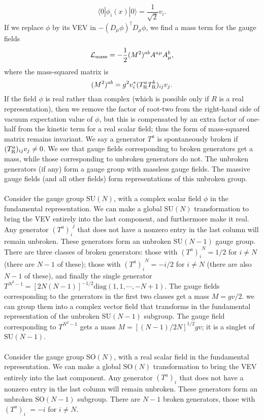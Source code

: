 \[\langle 0 | \phi_i(x) | 0 \rangle = \frac{1}{\sqrt{2}}v_i.\]
If we replace $\phi$ by its VEV in $-(D_{\mu}\phi)^{\dagger}D_{\mu}\phi$, we find a mass term for the gauge fields
\[\mathcal{L}_{\rm mass} = - \frac{1}{2}(M^2)^{ab}A^{a\mu}A^b_{\mu},\]
where the mass-squared matrix is
\[(M^2)^{ab} = g^2 v_i^* (T^a_{\rm R} T^b_{\rm R})_{ij}v_j .\]
If the field $\phi$ is real rather than complex (which is possible only if $R$ is a real representation), then we remove the factor of root-two from the right-hand side of vacuum expectation value of $\phi$, but this is compensated by an extra factor of one-half from the kinetic term for a real scalar field; thus the form of mass-squared matrix remains invariant.
We say a generator $T^a$ is spontaneously broken if $(T^a_{\rm R})_{ij}v_j \neq 0$. We see that gauge fields corresponding to broken generators get a mass, while those corresponding to unbroken generators do not. The unbroken generators (if any) form a gauge group with massless gauge fields. The massive gauge fields (and all other fields) form representations of this unbroken group.
\\ \\
Consider the gauge group $\mathrm{SU}(N)$, with a complex scalar field $\phi$ in the fundamental representation. We can make a global $\mathrm{SU}(N)$ transformation to bring the VEV entirely into the last component, and furthermore make it real. 
Any generator $(T^a)_{i}^{\phantom{j}j}$ that does not have a nonzero entry in the last column will remain unbroken. These generators form an unbroken $\mathrm{SU}(N-1)$ gauge group. There are three classes of broken generators: those with $(T^a)_{i}^{\phantom{j}N} = {1}/{2}$  for $i \neq N$ (there are $N-1$ of these); those with
$(T^a)_{i}^{\phantom{j}N} = -{i}/{2}$  for $i \neq N$ (there are also $N - 1$ of these), and finally the single
generator $T^{N^2 - 1} = [2N(N-1)]^{-1/2} \mathrm{diag}(1,1,\cdots,-N+1)$. 
The gauge fields corresponding to the generators in the first two classes get a mass $M = {gv}/{2}$.
we can group them into a complex vector field that transforms in the fundamental representation of the unbroken $\mathrm{SU}(N-1)$ subgroup. The gauge field corresponding to $T^{N^2-1}$ gets a mass $M = [(N-1)/2N]^{1/2}gv$; it is a singlet of $\mathrm{SU}(N-1)$.
\\ \\
Consider the gauge group $\mathrm{SO}(N)$, with a real scalar field in the fundamental representation. We can make a global $\mathrm{SO}(N)$ transformation to bring the VEV entirely into the last component. Any generator $(T^a)_{i}^{\phantom{j}}$ that does not have a nonzero entry in the last column will remain unbroken. These generators form an unbroken $\mathrm{SO}(N-1)$ subgroup. There are $N - 1$ broken generators, those with $(T^a)_{i}^{\phantom{N}} = -i$  for $i \neq N$. 
